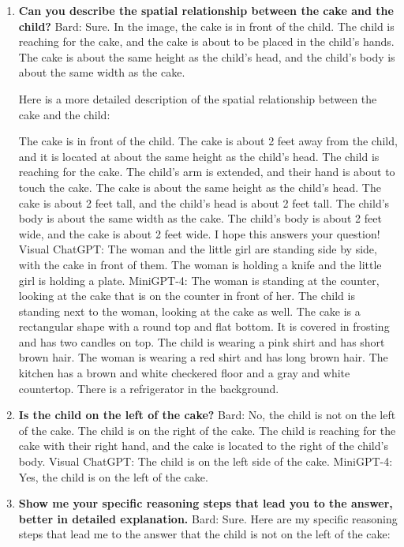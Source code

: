     \begin{enumerate}
        \item \textbf{Can you describe the spatial relationship between the cake and the child?}
        \subitem 
        Bard:
        Sure. In the image, the cake is in front of the child. The child is reaching for the cake, and the cake is about to be placed in the child's hands. The cake is about the same height as the child's head, and the child's body is about the same width as the cake.

        Here is a more detailed description of the spatial relationship between the cake and the child:

        The cake is in front of the child. The cake is about 2 feet away from the child, and it is located at about the same height as the child's head.
        The child is reaching for the cake. The child's arm is extended, and their hand is about to touch the cake.
        The cake is about the same height as the child's head. The cake is about 2 feet tall, and the child's head is about 2 feet tall.
        The child's body is about the same width as the cake. The child's body is about 2 feet wide, and the cake is about 2 feet wide.
        I hope this answers your question!
        \subitem Visual ChatGPT: The woman and the little girl are standing side by side, with the cake in front of them. The woman is holding a knife and the little girl is holding a plate.
        \subitem MiniGPT-4: The woman is standing at the counter, looking at the cake that is on the counter in front of her. The child is standing next to the woman, looking at the cake as well. The cake is a rectangular shape with a round top and flat bottom. It is covered in frosting and has two candles on top. The child is wearing a pink shirt and has short brown hair. The woman is wearing a red shirt and has long brown hair. The kitchen has a brown and white checkered floor and a gray and white countertop. There is a refrigerator in the background.
        \item \textbf{Is the child on the left of the cake?}
        \subitem Bard: No, the child is not on the left of the cake. The child is on the right of the cake. The child is reaching for the cake with their right hand, and the cake is located to the right of the child's body.
        \subitem Visual ChatGPT: The child is on the left side of the cake.
        \subitem MiniGPT-4: Yes, the child is on the left of the cake.
        \item \textbf{Show me your specific reasoning steps that lead you to the answer, better in detailed explanation.}
        \subitem Bard:
        Sure. Here are my specific reasoning steps that lead me to the answer that the child is not on the left of the cake:


\end{enumerate}
